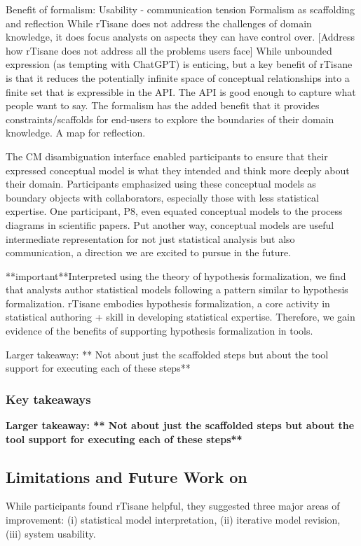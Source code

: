 Benefit of formalism: Usability - communication tension Formalism as scaffolding
and reflection While rTisane does not address the challenges of domain
knowledge, it does focus analysts on aspects they can have control over.
[Address how rTisane does not address all the problems users face] While
unbounded expression (as tempting with ChatGPT) is enticing, but a key benefit
of rTisane is that it reduces the potentially infinite space of conceptual
relationships into a finite set that is expressible in the API. The API is good
enough to capture what people want to say. The formalism has the added benefit
that it provides constraints/scaffolds for end-users to explore the boundaries
of their domain knowledge. A map for reflection. 

The CM disambiguation interface enabled participants to ensure that their
expressed conceptual model is what they intended and think more deeply about
their domain. Participants emphasized using these conceptual models as boundary
objects with collaborators, especially those with less statistical expertise.
One participant, P8, even equated conceptual models to the process diagrams in
scientific papers. Put another way, conceptual models are useful intermediate
representation for not just statistical analysis but also communication, a
direction we are excited to pursue in the future. 

**important**Interpreted using the theory of hypothesis formalization, we find
that analysts author statistical models following a pattern similar to
hypothesis formalization. rTisane embodies hypothesis formalization, a core
activity in statistical authoring + skill in developing statistical expertise.
Therefore, we gain evidence of the benefits of supporting hypothesis
formalization in tools. 

Larger takeaway: ** Not about just the scaffolded steps but about the tool
support for executing each of these steps**

\subsubsection{Key takeaways}
\textbf{Larger takeaway: ** Not about just the scaffolded steps but about the tool support for executing each of these steps**}

\subsection{Limitations and Future Work on \rTisane}
While participants found rTisane helpful, they suggested three major areas of
improvement: (i) statistical model interpretation, (ii) iterative model
revision, (iii) system usability. 

